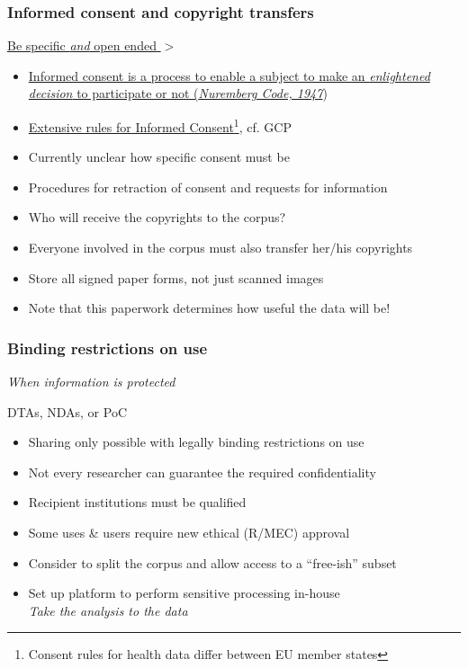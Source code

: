 \documentclass[xcolor=dvipsnames]{beamer}
\begin{document}
\begin{frame}[label=Informed consent and copyright transfers]
	\frametitle{Informed consent and copyright transfers}
	
	\begin{block}{\hyperlink{Clinical Trial Informed Consent}{Be specific {\em and} open ended {\hspace{6.5cm} \scriptsize $>$}}}
	\begin{itemize}
	\item \hyperlink{Clinical Trial Informed Consent}{Informed consent is a process to enable a subject to make an {\em enlightened decision} to participate or not ({\em Nuremberg Code, 1947}})
	\item \hyperlink{Clinical Trial Informed Consent}{Extensive rules for Informed Consent\footnote[frame]{Consent rules for health data differ between EU member states}, cf. GCP {\scriptsize\cite{ICH1996GCP}}}
	\item Currently unclear how specific consent must be
	\item Procedures for retraction of consent and requests for information
	\vskip 0.5cm
	\item Who will receive the copyrights to the corpus?
	\item Everyone involved in the corpus must also transfer her/his copyrights
	\item Store all signed paper forms, not just scanned images
	\vskip 0.5cm
	\item Note that this paperwork determines how useful the data will be!
	\end{itemize}
	\end{block}	
\end{frame}

\begin{frame}
	\frametitle{Binding restrictions on use}
	{\em When information is protected}
	\begin{block}{DTAs, NDAs, or PoC}
	\begin{itemize}
	\item Sharing only possible with legally binding restrictions on use
	\item Not every researcher can guarantee the required confidentiality
	\item Recipient institutions must be qualified
	\item Some uses \& users require new ethical (R/MEC) approval
	\item Consider to split the corpus and allow access to a ``free-ish'' subset
	\item Set up platform to perform sensitive processing in-house {\scriptsize\cite{budin2015datashield}}\\
			{\em Take the analysis to the data {\scriptsize\cite{DataSHIELD2014:short}}}
	\end{itemize}
	\end{block}	
\end{frame}
\end{document}
